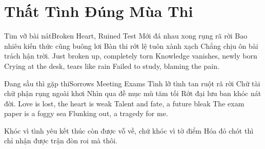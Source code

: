 \chapter{Thất Tình Đúng Mùa Thi}

\begin{tutuyetbox}{Tim vỡ bài nát}{Broken Heart, Ruined Test}
Mới đá nhau xong rụng rã rời
Bao nhiêu kiến thức cũng buông lơi
Bàn thi rớt lệ tuôn xành xạch
Chẳng chịu ôn bài trách hận trời.
\tcblower
Just broken up, completely torn 
Knowledge vanishes, newly born 
Crying at the desk, tears like rain 
Failed to study, blaming the pain.
\end{tutuyetbox}

\begin{tutuyetbox}{Đang sầu thì gặp thi}{Sorrows Meeting Exams}
Tình lỡ tình tan ruột rã rời
Chữ tài chữ phận rụng ngoài khơi
Nhìn qua đề mục mù tăm tối
Rớt đại lưu ban khóc nát đời.
\tcblower
Love is lost, the heart is weak 
Talent and fate, a future bleak 
The exam paper is a foggy sea 
Flunking out, a tragedy for me.
\end{tutuyetbox}

\begin{ghichu}
Khóc vì tình yêu kết thúc còn được vỗ về, chứ khóc vì tờ điểm Hóa đỏ chót thì chỉ nhận được trận đòn roi mà thôi.
\end{ghichu}